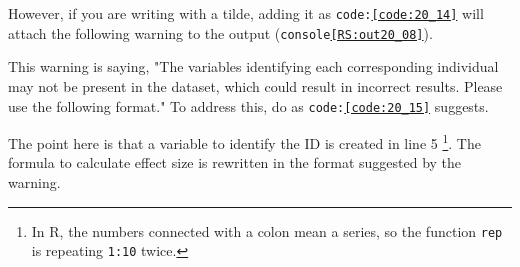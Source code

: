 \documentclass{ltjsbook}
\begin{document}

However, if you are writing with a tilde, adding it as \texttt{code:\ref{code:20_14}} will attach the following warning to the output (\texttt{console\ref{RS:out20_08}}).



This warning is saying, "The variables identifying each corresponding individual may not be present in the dataset, which could result in incorrect results. Please use the following format." To address this, do as \texttt{code:\ref{code:20_15}} suggests.

The point here is that a variable to identify the ID is created in line 5 \footnote{In R, the numbers connected with a colon mean a series, so the function \texttt{rep} is repeating \texttt{1:10} twice.}. The formula to calculate effect size is rewritten in the format suggested by the warning.

\end{document}
